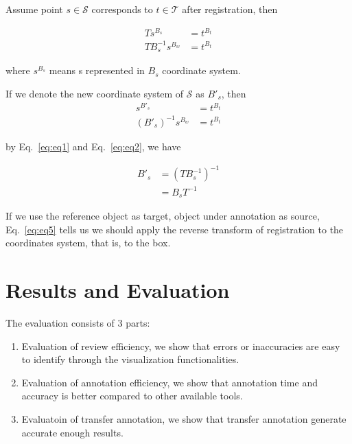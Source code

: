 \documentclass[letterpaper, 10 pt, conference]{ieeeconf}  %
\begin{document}
Assume point $s \in \mathcal{S}$ corresponds to $t \in \mathcal{T}$ after registration, then


\begin{align}
T s^{B_s} &= t^{B_t}\\
T B_s^{-1}s^{B_w} &= t^{B_t} \label{eq:eq1}
\end{align}

where $s^{B_s}$ means s represented in $B_s$ coordinate system.

If we denote the new coordinate system of $\mathcal{S}$ as $B'_s$, then
\begin{align} 
s^{B'_s} &= t^{B_t}\\
(B'_s)^{-1}s^{B_w} &= t^{B_t} \label{eq:eq2}
\end{align}


by Eq.~\eqref{eq:eq1} and Eq.~\eqref{eq:eq2}, we have

\begin{align}
{B'_s} & = (T B_s^{-1})^{-1}\\
       & = B_s T^{-1} \label{eq:eq5}
\end{align}

If we use the reference object as target, object under annotation as source, Eq.~\eqref{eq:eq5} tells us we should apply the reverse transform of registration to the coordinates system, that is, to the box.



\section{Results and Evaluation}
\label {Metrics}

The evaluation consists of 3 parts:
\begin{enumerate}
	\item Evaluation of review efficiency, we show that errors or inaccuracies are easy to identify through the visualization functionalities.
	\item Evaluation of annotation efficiency, we show that annotation time and accuracy is better compared to other available tools.
	\item Evaluatoin of transfer annotation, we show that transfer annotation generate accurate enough results.
\end{enumerate}
\end{document}
